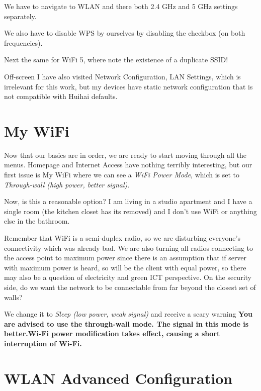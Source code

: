\documentclass[../wifi-security.tex]{subfiles}
\begin{document}
We have to navigate to WLAN and there both 2.4 GHz and 5 GHz settings separately.

We also have to disable WPS by ourselves by disabling the checkbox (on both frequencies).


Next the same for WiFi 5, where note the existence of a duplicate SSID!

Off-screen I have also visited Network Configuration, LAN Settings, which is irrelevant for this work, but my devices have static network configuration that is not compatible with Huihai defaults.

\section{My WiFi}

Now that our basics are in order, we are ready to start moving through all the menus. Homepage and Internet Access have nothing terribly interesting, but our first issue is My WiFi where we can see a \textit{WiFi Power Mode}, which is set to \textit{Through-wall (high power, better signal)}.

Now, is this a reasonable option? I am living in a studio apartment and I have a single room (the kitchen closet has its removed) and I don't use WiFi or anything else in the bathroom.

Remember that WiFi is a semi-duplex radio, so we are disturbing everyone's connectivity which was already bad. We are also turning all radios connecting to the access point to maximum power since there is an assumption that if server with maximum power is heard, so will be the client with equal power, so there may also be a question of electricity and green ICT perspective. On the security side, do we want the network to be connectable from far beyond the closest set of walls? %

We change it to \textit{Sleep (low power, weak signal)} and receive a scary warning \textbf{You are advised to use the through-wall mode. The signal in this mode is better.Wi-Fi power modification takes effect, causing a short interruption of Wi-Fi.}



\section{WLAN Advanced Configuration}
\end{document}
